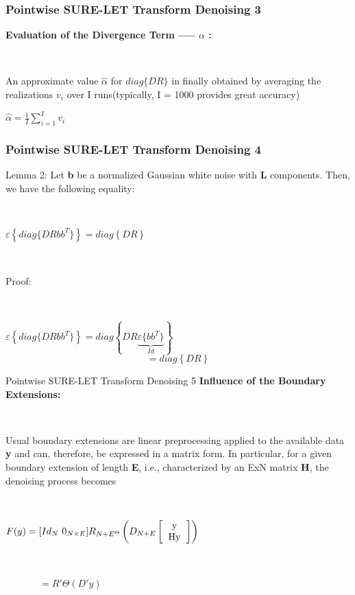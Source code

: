 \documentclass{beamer}
\begin{document}
	
	\begin{frame}
\frametitle{Pointwise SURE-LET Transform Denoising 3}
	\textbf{Evaluation of the Divergence Term ----- $\alpha$ :}
	
	\
	
	
	An approximate value $\hat{\alpha}$ for $diag \{DR\}$ in finally obtained by averaging the realizations $v_i$ over I runs(typically, I = 1000 provides great accuracy)
	
	\begin{center}
		$\hat\alpha=\frac{1}{I}\displaystyle\sum_{i=1}^{I}v_i$
	\end{center}
	\end{frame}
	
	
	\begin{frame}
		\frametitle{Pointwise SURE-LET Transform Denoising 4}
Lemma 2: Let \textbf{b} be a normalized Gaussian white noise with \textbf{L} components. Then, we have the following equality:

\

$\varepsilon\left\{diag \{DRbb^T\}\right\}=diag\left\{DR\right\}$	

\

Proof:

\

$\varepsilon\left\{diag \{DRbb^T\}\right\}=diag\left\{DR\underbrace{\varepsilon \{bb^T\}}_{Id}\right\}$
$$=diag\left\{DR\right\}$$
	\end{frame}
	
	
	\begin{frame}{Pointwise SURE-LET Transform Denoising 5}
\textbf{Influence of the Boundary Extensions:}
	
	\
	
	Usual boundary extensions are linear preprocessing applied to the available data \textbf{y} and can, therefore, be expressed in a matrix form. In particular, for a given boundary extension of length \textbf{E}, i.e., characterized by an ExN matrix \textbf{H}, the denoising process becomes
	
	\

$F(y)=[Id_N \ 0_{N \times E}]R_{N+E^{\Theta}}\left(D_{N+E}\left[\begin{tabular}{c}
y \\ 
Hy \\ 
\end{tabular} \right] \right)$
	
	\
	
\ \ \ \ \ \ \ $=R'\Theta(D'y)$
	

	

\end{frame}
\end{document}
